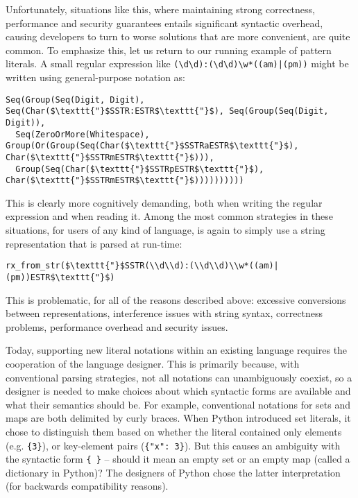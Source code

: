Unfortunately, situations like this, where maintaining strong correctness, performance and security guarantees entails significant syntactic overhead, causing developers to turn to worse solutions that are more convenient, are quite common. To emphasize this, let us return to our running example of pattern literals. A small regular expression like \verb!(\d\d):(\d\d)\w*((am)|(pm))! might be written using general-purpose notation as:
\begin{lstlisting}
Seq(Group(Seq(Digit, Digit), Seq(Char($\texttt{"}$SSTR:ESTR$\texttt{"}$), Seq(Group(Seq(Digit, Digit)), 
  Seq(ZeroOrMore(Whitespace), Group(Or(Group(Seq(Char($\texttt{"}$SSTRaESTR$\texttt{"}$), Char($\texttt{"}$SSTRmESTR$\texttt{"}$))), 
  Group(Seq(Char($\texttt{"}$SSTRpESTR$\texttt{"}$), Char($\texttt{"}$SSTRmESTR$\texttt{"}$))))))))))
\end{lstlisting}
This is clearly more cognitively demanding, both when writing the regular expression and when reading it. Among the most common strategies in these situations, for users of any kind of language, is again to simply use a string representation that is parsed at run-time:
\begin{lstlisting}
rx_from_str($\texttt{"}$SSTR(\\d\\d):(\\d\\d)\\w*((am)|(pm))ESTR$\texttt{"}$)
\end{lstlisting}
This is problematic, for all of the reasons described above: excessive conversions between representations, interference issues with string syntax, correctness problems, performance overhead and security issues.

Today, supporting new literal notations within an existing language requires the cooperation of the language designer. This is primarily because, with conventional parsing strategies, not all notations can unambiguously coexist, so a designer is needed to make choices about which syntactic forms are available and what their semantics should be. For example, conventional notations for sets and maps are both delimited by curly braces. When Python introduced set literals, it chose to distinguish them based on whether the literal contained only elements (e.g. \verb|{3}|), or key-element pairs (\verb|{"x": 3}|). But this causes an ambiguity with the syntactic form \verb|{ }| -- should it mean an empty set or an empty map (called a dictionary in Python)? The designers of Python chose the latter interpretation (for backwards compatibility reasons).

